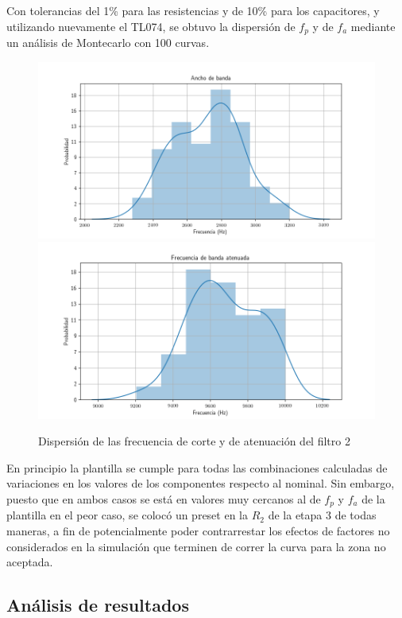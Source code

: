 \documentclass[../../tc_tp5_main.tex]{subfiles}
\begin{document}
Con tolerancias del 1\% para las resistencias y de 10\% para los capacitores, y utilizando nuevamente el TL074, se obtuvo la dispersi\'on de $f_p$ y de $f_a$ mediante un an\'alisis de Montecarlo con 100 curvas. 

\begin{figure}[H]
	\centering
	\includegraphics[scale=0.7]{imagenes/bes_hist_bw.png}
	\includegraphics[scale=0.7]{imagenes/bes_hist_fa.png}
	\caption{Dispersi\'on de las frecuencia de corte y de atenuaci\'on del filtro 2}
\end{figure}

En principio la plantilla se cumple para todas las combinaciones calculadas de variaciones en los valores de los componentes respecto al nominal. Sin embargo, puesto que en ambos casos se est\'a en valores muy cercanos al de $f_p$ y $f_a$ de la plantilla en el peor caso, se coloc\'o un preset en la $R_2$ de la etapa 3 de todas maneras, a fin de potencialmente poder contrarrestar los efectos de factores no considerados en la simulaci\'on que terminen de correr la curva para la zona no aceptada. \par


\subsection{An\'alisis de resultados}
\end{document}
